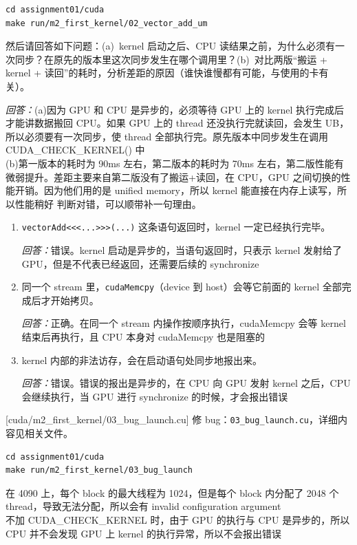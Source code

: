 \documentclass[11pt,a4paper,fontset=none]{ctexart}
\begin{document}
\begin{lstlisting}
cd assignment01/cuda
make run/m2_first_kernel/02_vector_add_um
\end{lstlisting}

然后请回答如下问题：(a)~kernel 启动之后、CPU 读结果之前，为什么必须有一次同步？在原先的版本里这次同步发生在哪个调用里？(b)~对比两版“搬运 + kernel + 读回”的耗时，分析差距的原因（谁快谁慢都有可能，与使用的卡有关）。
\par\noindent\textit{回答：}(a)因为 GPU 和 CPU 是异步的，必须等待 GPU 上的 kernel 执行完成后才能讲数据搬回 CPU。如果 GPU 上的 thread 还没执行完就读回，会发生 UB，所以必须要有一次同步，使 thread 全部执行完。原先版本中同步发生在调用 CUDA\_CHECK\_KERNEL() 中 \\
(b)第一版本的耗时为 90ms 左右，第二版本的耗时为 70ms 左右，第二版性能有微弱提升。差距主要来自第二版没有了搬运+读回，在 CPU，GPU 之间切换的性能开销。因为他们用的是 unified memory，所以 kernel 能直接在内存上读写，所以性能稍好
判断对错，可以顺带补一句理由。
\begin{enumerate}[label=(\alph*)]
  \item \texttt{vectorAdd<<<...>>>(...)} 这条语句返回时，kernel 一定已经执行完毕。
  \par\noindent\textit{回答：}错误。kernel 启动是异步的，当语句返回时，只表示 kernel 发射给了 GPU，但是不代表已经返回，还需要后续的 synchronize
  \item 同一个 stream 里，\texttt{cudaMemcpy}（device 到 host）会等它前面的 kernel 全部完成后才开始拷贝。
  \par\noindent\textit{回答：}正确。在同一个 stream 内操作按顺序执行，cudaMemcpy 会等 kernel 结束后再执行，且 CPU 本身对 cudaMemcpy 也是阻塞的
  \item kernel 内部的非法访存，会在启动语句处同步地报出来。
  \par\noindent\textit{回答：}错误。错误的报出是异步的，在 CPU 向 GPU 发射 kernel 之后，CPU 会继续执行，当 GPU 进行 synchronize 的时候，才会报出错误
\end{enumerate}

[cuda/m2\_first\_kernel/03\_bug\_launch.cu]
修 bug：\texttt{03\_bug\_launch.cu}，详细内容见相关文件。\\

\begin{lstlisting}
cd assignment01/cuda
make run/m2_first_kernel/03_bug_launch
\end{lstlisting}
在 4090 上，每个 block 的最大线程为 1024，但是每个 block 内分配了 2048 个 thread，导致无法分配，所以会有 invalid configuration argument\\
不加 CUDA\_CHECK\_KERNEL 时，由于 GPU 的执行与 CPU 是异步的，所以 CPU 并不会发现 GPU 上 kernel 的执行异常，所以不会报出错误
\end{document}
